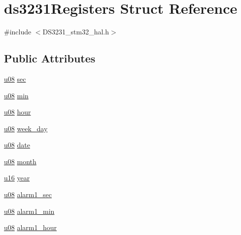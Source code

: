 \hypertarget{structds3231Registers}{}\section{ds3231\+Registers Struct Reference}
\label{structds3231Registers}


{\ttfamily \#include $<$D\+S3231\+\_\+stm32\+\_\+hal.\+h$>$}

\subsection*{Public Attributes}
\begin{DoxyCompactItemize}
\item 
\hyperlink{main_8h_ae2b6b8613a28b013c8c7fdaf93cdb1e1}{u08} \hyperlink{structds3231Registers_ad6ce5e46b27423f764cbf9d8ef35dbe6}{sec}
\item 
\hyperlink{main_8h_ae2b6b8613a28b013c8c7fdaf93cdb1e1}{u08} \hyperlink{structds3231Registers_acecda70e3d23158dad9a750cec95c12f}{min}
\item 
\hyperlink{main_8h_ae2b6b8613a28b013c8c7fdaf93cdb1e1}{u08} \hyperlink{structds3231Registers_a77a0364a71d2b2f8a410b862cfbd3aa8}{hour}
\item 
\hyperlink{main_8h_ae2b6b8613a28b013c8c7fdaf93cdb1e1}{u08} \hyperlink{structds3231Registers_a05a09f7ebf82613932028007e964d41a}{week\+\_\+day}
\item 
\hyperlink{main_8h_ae2b6b8613a28b013c8c7fdaf93cdb1e1}{u08} \hyperlink{structds3231Registers_a5a276bfb278a1e3bb29c5e967c032981}{date}
\item 
\hyperlink{main_8h_ae2b6b8613a28b013c8c7fdaf93cdb1e1}{u08} \hyperlink{structds3231Registers_a2ff52439708c3d66d2397404ea58f8d3}{month}
\item 
\hyperlink{main_8h_a2b19d553290a8d4a083d3c03280ea800}{u16} \hyperlink{structds3231Registers_a671343dd45a75d94e122178d71e3a3a9}{year}
\item 
\hyperlink{main_8h_ae2b6b8613a28b013c8c7fdaf93cdb1e1}{u08} \hyperlink{structds3231Registers_a669972a710c9a96f0d77f4bbea4e7744}{alarm1\+\_\+sec}
\item 
\hyperlink{main_8h_ae2b6b8613a28b013c8c7fdaf93cdb1e1}{u08} \hyperlink{structds3231Registers_aee203cb47166c50f5e3b65847c77175e}{alarm1\+\_\+min}
\item 
\hyperlink{main_8h_ae2b6b8613a28b013c8c7fdaf93cdb1e1}{u08} \hyperlink{structds3231Registers_a571b8ab845bf8da1446fd7e06bbc560f}{alarm1\+\_\+hour}
\item 

\end{DoxyCompactItemize}
